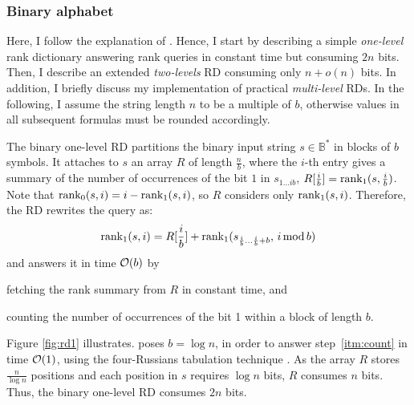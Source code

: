 \subsubsection{Binary alphabet}

Here, I follow the explanation of \citep{Navarro2007}.
Hence, I start by describing a simple \emph{one-level} rank dictionary answering rank queries in constant time but consuming $2n$ bits.
Then, I describe an extended \emph{two-levels} RD consuming only $n + o(n)$ bits.
In addition, I briefly discuss my implementation of practical \emph{multi-level} RDs.
In the following, I assume \wlogs the string length $n$ to be a multiple of $b$, otherwise values in all subsequent formulas must be rounded accordingly.

The binary one-level RD partitions the binary input string $s \in \mathbb{B}^*$ in blocks of $b$ symbols.
It attaches to $s$ an array $R$ of length $\frac{n}{b}$, where the $i$-th entry gives a summary of the number of occurrences of the bit $1$ in $s_{1 \dots i b}$, \ie $R[\frac{i}{b}] = \text{rank}_1(s, \frac{i}{b})$.
Note that $\text{rank}_0(s, i) = i - \text{rank}_1(s, i)$, so $R$ considers only $\text{rank}_1(s, i)$.
Therefore, the RD rewrites the query as:
\begin{eqnarray}
\rank_1(s,i) = R[\frac{i}{b}] + \rank_1(s_{\frac{i}{b} \dots \frac{i}{b}+b}, \, i \imod{b})
\end{eqnarray}
and answers it in time $\mathcal{O}(b)$ by 
\begin{inparaenum}[(i)]
\item \label{itm:fetch} fetching the rank summary from $R$ in constant time, and
\item \label{itm:count} counting the number of occurrences of the bit 1 within a block of length $b$.
\end{inparaenum}
Figure \ref{fig:rd1} illustrates.
\citeauthor{Jacobson1989} poses $b=\log{n}$, in order to answer step~\ref{itm:count} in time $\mathcal{O}(1)$, using the four-Russians tabulation technique \citep{Arlazarov1975}.
As the array $R$ stores $\frac{n}{\log{n}}$ positions and each position in $s$ requires $\log{n}$ bits, $R$ consumes $n$ bits.
Thus, the binary one-level RD consumes $2n$ bits.

